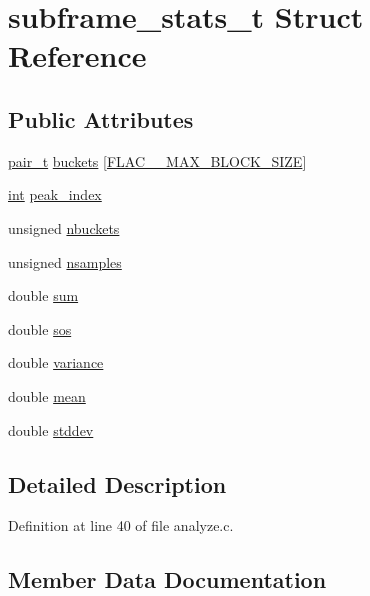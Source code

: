 \hypertarget{structsubframe__stats__t}{}\section{subframe\+\_\+stats\+\_\+t Struct Reference}
\label{structsubframe__stats__t}
\subsection*{Public Attributes}
\begin{DoxyCompactItemize}
\item 
\hyperlink{structpair__t}{pair\+\_\+t} \hyperlink{structsubframe__stats__t_a584be702a747fc71ec30d3f8e3a74d27}{buckets} \mbox{[}\hyperlink{group__flac__format_gaef78bc1b04f721e7b4563381f5514e8d}{F\+L\+A\+C\+\_\+\+\_\+\+M\+A\+X\+\_\+\+B\+L\+O\+C\+K\+\_\+\+S\+I\+ZE}\mbox{]}
\item 
\hyperlink{xmltok_8h_a5a0d4a5641ce434f1d23533f2b2e6653}{int} \hyperlink{structsubframe__stats__t_ac8b291b30f10f9d79b68e654fcbbec86}{peak\+\_\+index}
\item 
unsigned \hyperlink{structsubframe__stats__t_a4776cf2c62aaf31fa6b11a9b92f713eb}{nbuckets}
\item 
unsigned \hyperlink{structsubframe__stats__t_a09a6de07b7d56145bee2bad134c163b1}{nsamples}
\item 
double \hyperlink{structsubframe__stats__t_a83003065be8178100e1b6f138a1b89a5}{sum}
\item 
double \hyperlink{structsubframe__stats__t_a772a12905f1c3a79da8065e3f1fb163c}{sos}
\item 
double \hyperlink{structsubframe__stats__t_a72a259cebf1d47bc52c96599481bec41}{variance}
\item 
double \hyperlink{structsubframe__stats__t_aec416770c6946c649c9b1d6805a00bfb}{mean}
\item 
double \hyperlink{structsubframe__stats__t_a3c472ff929722bf035a792b6ca855cf4}{stddev}
\end{DoxyCompactItemize}


\subsection{Detailed Description}


Definition at line 40 of file analyze.\+c.



\subsection{Member Data Documentation}
